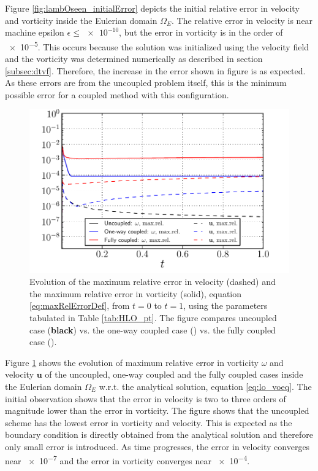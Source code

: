 Figure \ref{fig:lambOseen_initialError} depicts the initial relative error in velocity and vorticity inside the Eulerian domain $\Omega_E$. The relative error in velocity is near machine epsilon $\epsilon \le \num{e-10}$, but the error in vorticity is in the order of \num{e-5}. This occurs because the solution was initialized using the velocity field and the vorticity was determined numerically as described in section \ref{subsec:dtvf}. Therefore, the increase in the error shown in figure is as expected. As these errors are from the uncoupled problem itself, this is the minimum possible error for a coupled method with this configuration.

	\begin{figure}[!t]
	\centering
	\includegraphics[width=0.6\linewidth]{./figures/validation/lambOseent2/lambOseen_comparision_corrected.pdf}
	\caption{Evolution of the maximum relative error in velocity (dashed) and the maximum relative error in vorticity (solid), equation \ref{eq:maxRelErrorDef}, from $t=0$ to $t=1$, using the parameters tabulated in Table \ref{tab:HLO_pt}. The figure compares uncoupled case (\textbf{black}) vs. the one-way coupled case ({}) vs. the fully coupled case ({}).}
	\label{fig:lambOseen_comparison}
	\end{figure}

Figure \ref{fig:lambOseen_comparison} shows the evolution of maximum relative error in vorticity $\omega$ and velocity $\mathbf{u}$ of the uncoupled, one-way coupled and the fully coupled cases inside the Eulerian domain $\Omega_E$ w.r.t. the analytical solution, equation \ref{eq:lo_voeq}. The initial observation shows that the error in velocity is two to three orders of magnitude lower than the error in vorticity. The figure shows that the uncoupled scheme has the lowest error in vorticity and velocity. This is expected as the boundary condition is directly obtained from the analytical solution and therefore only small error is introduced. As time progresses, the error in velocity converges near \num{e-7} and the error in vorticity converges near \num{e-4}.

